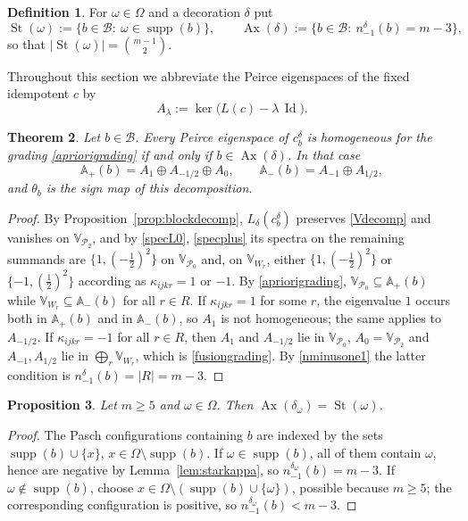 \documentclass[times,11pt,reqno]{amsproc}
\newtheorem{theorem}{Theorem}[section]
\newtheorem{proposition}[theorem]{Proposition}
\theoremstyle{definition}
\newtheorem{definition}[theorem]{Definition}
\numberwithin{equation}{section}
\def\alg{\mathbb{A}}
\def\valg{\mathbb{V}}
\newcommand{\Id}{\operatorname{Id}}
\DeclareMathOperator{\supp}{supp}
\DeclareMathOperator{\St}{St}
\DeclareMathOperator{\Ax}{Ax}
\begin{document}
\begin{definition}\label{def:starax}
For $\omega\in\Omega$ and a decoration $\delta$ put
$$
\St(\omega):=\{b\in\mathcal B:\ \omega\in\supp(b)\},
\qquad
\Ax(\delta):=\{b\in\mathcal B:\ n^{\delta}_{-1}(b)=m-3\},
$$
so that $|\St(\omega)|=\binom{m-1}{2}$.
\end{definition}

Throughout this section we abbreviate the Peirce eigenspaces of the fixed idempotent
 $c$ by
$$A_\lambda:=\ker\bigl(L(c)-\lambda\,\Id\bigr).
$$


\begin{theorem}\label{thm:grading}
Let $b\in\mathcal B$. Every Peirce eigenspace of $c_b^\delta$ is
homogeneous for the grading \eqref{apriorigrading} if and only if
$b\in\Ax(\delta)$. In that case
\begin{equation}\label{fusiongrading}
\alg_{+}(b)=A_{1}\oplus A_{-1/2}\oplus A_{0},
\qquad
\alg_{-}(b)=A_{-1}\oplus A_{1/2},
\end{equation}
and $\theta_b$ is the sign map of this decomposition.
\end{theorem}

\begin{proof}
By Proposition~\ref{prop:blockdecomp}, $L_\delta(c_b^\delta)$ preserves
\eqref{Vdecomp} and vanishes on $\valg_{\mathcal P_2}$, and by
\eqref{specL0}, \eqref{specplus} its spectra on the remaining summands
are $\{1,(-\tfrac12)^2\}$ on $\valg_{\mathcal P_0}$ and, on
$\valg_{W_r}$, either $\{1,(-\tfrac12)^2\}$ or $\{-1,(\tfrac12)^2\}$
according as $\kappa_{ijkr}=1$ or $-1$. By \eqref{apriorigrading},
$\valg_{\mathcal P_0}\subseteq\alg_+(b)$ while
$\valg_{W_r}\subseteq\alg_-(b)$ for all $r\in R$. If $\kappa_{ijkr}=1$
for some $r$, the eigenvalue $1$ occurs both in $\alg_+(b)$ and in
$\alg_-(b)$, so $A_1$ is not homogeneous; the same applies to
$A_{-1/2}$. If $\kappa_{ijkr}=-1$ for all $r\in R$, then $A_1$ and
$A_{-1/2}$ lie in $\valg_{\mathcal P_0}$, $A_0=\valg_{\mathcal P_2}$ and
$A_{-1},A_{1/2}$ lie in $\bigoplus_r\valg_{W_r}$, which is
\eqref{fusiongrading}. By \eqref{nminusone1} the latter condition is
$n^\delta_{-1}(b)=|R|=m-3$.
\end{proof}

\begin{proposition}\label{prop:star}
Let $m\ge5$ and $\omega\in\Omega$. Then $\Ax(\delta_\omega)=\St(\omega)$.
\end{proposition}

\begin{proof}
The Pasch configurations containing $b$ are indexed by the sets
$\supp(b)\cup\{x\}$, $x\in\Omega\setminus\supp(b)$. If
$\omega\in\supp(b)$, all of them contain $\omega$, hence are negative by
Lemma~\ref{lem:starkappa}, so $n^{\delta_\omega}_{-1}(b)=m-3$. If
$\omega\notin\supp(b)$, choose
$x\in\Omega\setminus(\supp(b)\cup\{\omega\})$, possible because
$m\ge5$; the corresponding configuration is positive, so
$n^{\delta_\omega}_{-1}(b)<m-3$.
\end{proof}
\end{document}
